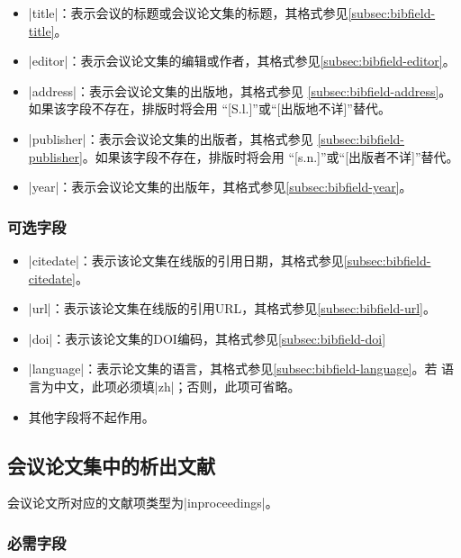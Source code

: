 \begin{itemize}
\item |title|：表示会议的标题或会议论文集的标题，其格式参见\ref{subsec:bibfield-title}。
\item |editor|：表示会议论文集的编辑或作者，其格式参见\ref{subsec:bibfield-editor}。
\item |address|：表示会议论文集的出版地，其格式参见
  \ref{subsec:bibfield-address}。如果该字段不存在，{\BibTeX}排版时将会用
  ``[S.l.]''或``[出版地不详]''替代。
\item |publisher|：表示会议论文集的出版者，其格式参见
  \ref{subsec:bibfield-publisher}。如果该字段不存在，{\BibTeX}排版时将会用
  ``[s.n.]''或``[出版者不详]''替代。
\item |year|：表示会议论文集的出版年，其格式参见\ref{subsec:bibfield-year}。
\end{itemize}

\subsubsection{可选字段}

\begin{itemize}
\item |citedate|：表示该论文集在线版的引用日期，其格式参见\ref{subsec:bibfield-citedate}。
\item |url|：表示该论文集在线版的引用URL，其格式参见\ref{subsec:bibfield-url}。
\item |doi|：表示该论文集的DOI编码，其格式参见\ref{subsec:bibfield-doi}
\item |language|：表示论文集的语言，其格式参见\ref{subsec:bibfield-language}。若
  语言为中文，此项必须填|zh|；否则，此项可省略。
\item 其他字段将不起作用。
\end{itemize}

\subsection{会议论文集中的析出文献}\label{subsec:bibtype-inproceedings}

会议论文所对应的{\BibTeX}文献项类型为|inproceedings|。

\subsubsection{必需字段}

